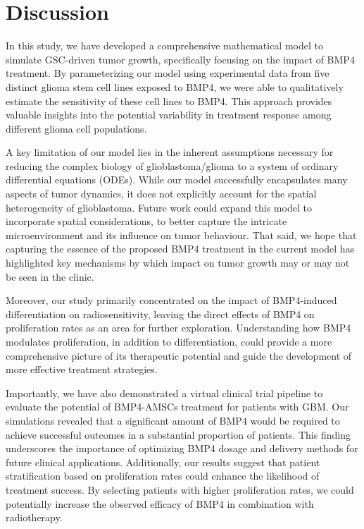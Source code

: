 \documentclass[
  default,
]{sn-jnl}
\begin{document}
\section{Discussion}\label{sec-discussion}

In this study, we have developed a comprehensive mathematical model to
simulate GSC-driven tumor growth, specifically focusing on the impact of
BMP4 treatment. By parameterizing our model using experimental data from
five distinct glioma stem cell lines exposed to BMP4, we were able to
qualitatively estimate the sensitivity of these cell lines to BMP4. This
approach provides valuable insights into the potential variability in
treatment response among different glioma cell populations.

A key limitation of our model lies in the inherent assumptions necessary
for reducing the complex biology of glioblastoma/glioma to a system of
ordinary differential equations (ODEs). While our model successfully
encapsulates many aspects of tumor dynamics, it does not explicitly
account for the spatial heterogeneity of glioblastoma. Future work could
expand this model to incorporate spatial considerations, to better
capture the intricate microenvironment and its influence on tumor
behaviour. That said, we hope that capturing the essence of the proposed
BMP4 treatment in the current model has highlighted key mechanisms by
which impact on tumor growth may or may not be seen in the clinic.

Moreover, our study primarily concentrated on the impact of BMP4-induced
differentiation on radiosensitivity, leaving the direct effects of BMP4
on proliferation rates as an area for further exploration. Understanding
how BMP4 modulates proliferation, in addition to differentiation, could
provide a more comprehensive picture of its therapeutic potential and
guide the development of more effective treatment strategies.

Importantly, we have also demonstrated a virtual clinical trial pipeline
to evaluate the potential of BMP4-AMSCs treatment for patients with GBM.
Our simulations revealed that a significant amount of BMP4 would be
required to achieve successful outcomes in a substantial proportion of
patients. This finding underscores the importance of optimizing BMP4
dosage and delivery methods for future clinical applications.
Additionally, our results suggest that patient stratification based on
proliferation rates could enhance the likelihood of treatment success.
By selecting patients with higher proliferation rates, we could
potentially increase the observed efficacy of BMP4 in combination with
radiotherapy.
\end{document}
